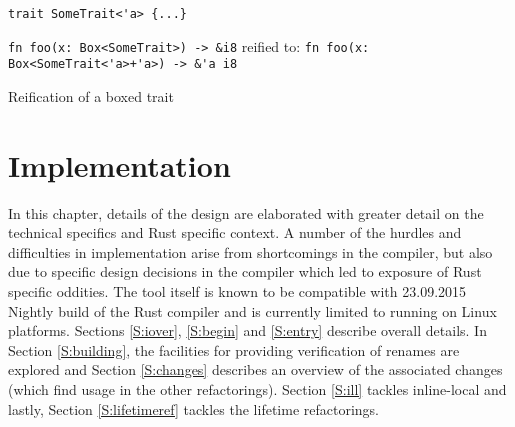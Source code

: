 \begin{fig}
\begin{verbatim}
trait SomeTrait<'a> {...}
\end{verbatim}
{\verb|fn foo(x: Box<SomeTrait>) -> &i8|}\newline
reified to: {\verb|fn foo(x: Box<SomeTrait<'a>+'a>) -> &'a i8|}
\caption{Reification of a boxed trait}
\label{Fig:boxedtrait}
\end{fig}



\chapter{Implementation}\label{C:impl}

In this chapter, details of the design are elaborated with greater detail on the technical specifics and Rust specific context. A number of the hurdles and difficulties in implementation arise from shortcomings in the compiler, but also due to specific design decisions in the compiler which led to exposure of Rust specific oddities. The tool itself is known to be compatible with 23.09.2015 Nightly build of the Rust compiler and is currently limited to running on Linux platforms. Sections \ref{S:iover}, \ref{S:begin} and \ref{S:entry} describe overall details. In Section \ref{S:building}, the facilities for providing verification of renames are explored and Section \ref{S:changes} describes an overview of the associated changes (which find usage in the other refactorings). Section \ref{S:ill} tackles inline-local and lastly, Section \ref{S:lifetimeref} tackles the lifetime refactorings.



